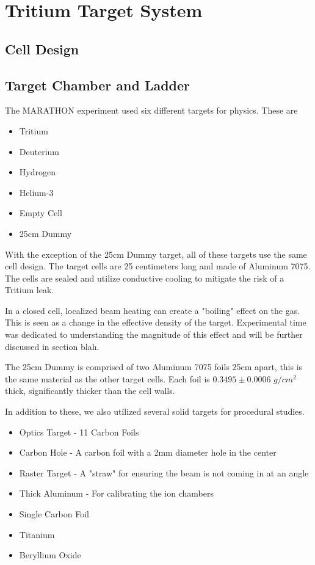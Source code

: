 \section{Tritium Target System}

\subsection{Cell Design}

\subsection{Target Chamber and Ladder}
The MARATHON experiment used six different targets for physics. These are
\begin{itemize}
	\item Tritium
	\item Deuterium
	\item Hydrogen
	\item Helium-3
	\item Empty Cell
	\item 25cm Dummy
\end{itemize}

With the exception of the 25cm Dummy target, all of these targets use the same cell design. The target cells are 25 centimeters long and made of Aluminum 7075. The cells are sealed and utilize conductive cooling to mitigate the risk of a Tritium leak.

In a closed cell, localized beam heating can create a "boiling" effect on the gas. This is seen as a change in the effective density of the target. Experimental time was dedicated to understanding the magnitude of this effect and will be further discussed in section blah.


The 25cm Dummy is comprised of two Aluminum 7075 foils 25cm apart, this is the same material as the other target cells. Each foil is $0.3495\pm0.0006$ $g/cm^2$ thick, significantly thicker than the cell walls.

In addition to these, we also utilized several solid targets for procedural studies. %
\begin{itemize}
	\item Optics Target - 11 Carbon Foils
	\item Carbon Hole - A carbon foil with a 2mm diameter hole in the center
	\item Raster Target - A "straw" for ensuring the beam is not coming in at an angle
	\item Thick Aluminum - For calibrating the ion chambers
	\item Single Carbon Foil
	\item Titanium
	\item Beryllium Oxide
\end{itemize}